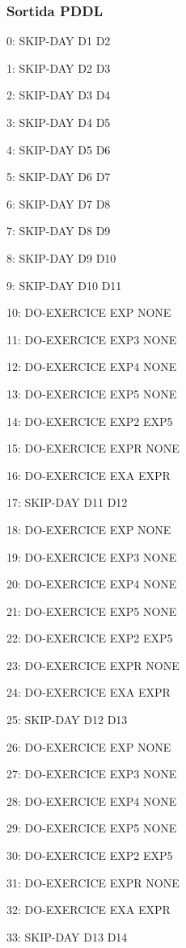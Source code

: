 \documentclass[a4paper,12pt, UTF-8]{article}
\begin{document}
\subsubsection{Sortida PDDL}
\setlength{\parskip}{0em}
    0: SKIP-DAY D1 D2
    
    1: SKIP-DAY D2 D3
    
    2: SKIP-DAY D3 D4
    
    3: SKIP-DAY D4 D5
    
    4: SKIP-DAY D5 D6
    
    5: SKIP-DAY D6 D7
    
    6: SKIP-DAY D7 D8
    
    7: SKIP-DAY D8 D9
    
    8: SKIP-DAY D9 D10
    
    9: SKIP-DAY D10 D11
    
    10: DO-EXERCICE EXP NONE
    
    11: DO-EXERCICE EXP3 NONE
    
    12: DO-EXERCICE EXP4 NONE
    
    13: DO-EXERCICE EXP5 NONE
    
    14: DO-EXERCICE EXP2 EXP5
    
    15: DO-EXERCICE EXPR NONE
    
    16: DO-EXERCICE EXA EXPR
    
    17: SKIP-DAY D11 D12
    
    18: DO-EXERCICE EXP NONE
    
    19: DO-EXERCICE EXP3 NONE
    
    20: DO-EXERCICE EXP4 NONE
    
    21: DO-EXERCICE EXP5 NONE
    
    22: DO-EXERCICE EXP2 EXP5
    
    23: DO-EXERCICE EXPR NONE
    
    24: DO-EXERCICE EXA EXPR
    
    25: SKIP-DAY D12 D13
    
    26: DO-EXERCICE EXP NONE
    
    27: DO-EXERCICE EXP3 NONE
    
    28: DO-EXERCICE EXP4 NONE
    
    29: DO-EXERCICE EXP5 NONE
    
    30: DO-EXERCICE EXP2 EXP5
    
    31: DO-EXERCICE EXPR NONE
    
    32: DO-EXERCICE EXA EXPR
    
    33: SKIP-DAY D13 D14
    
\end{document}
